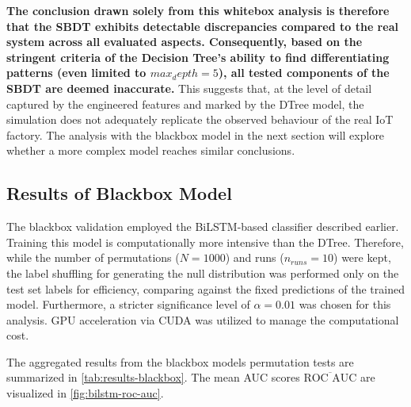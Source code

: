 \textbf{The conclusion drawn solely from this whitebox analysis is therefore that the SBDT exhibits detectable discrepancies compared to the real system across all evaluated aspects. Consequently, based on the stringent criteria of the Decision Tree's ability to find differentiating patterns (even limited to $max_depth=5$), all tested components of the SBDT are deemed inaccurate.} This suggests that, at the level of detail captured by the engineered features and marked by the DTree model, the simulation does not adequately replicate the observed behaviour of the real IoT factory. The analysis with the blackbox model in the next section will explore whether a more complex model reaches similar conclusions.

\subsection*{Results of Blackbox Model}

The blackbox validation employed the BiLSTM-based classifier described earlier. Training this model is computationally more intensive than the DTree. Therefore, while the number of permutations ($N=1000$) and runs ($n_{runs}=10$) were kept, the label shuffling for generating the null distribution was performed only on the test set labels for efficiency, comparing against the fixed predictions of the trained model. Furthermore, a stricter significance level of $\alpha = 0.01$ was chosen for this analysis. GPU acceleration via CUDA \autocite{NVIDIA_CUDA} was utilized to manage the computational cost.

The aggregated results from the blackbox models permutation tests are summarized in \autoref{tab:results-blackbox}. The mean AUC scores $\overline{\text{ROC AUC}}$ are visualized in \autoref{fig:bilstm-roc-auc}.


